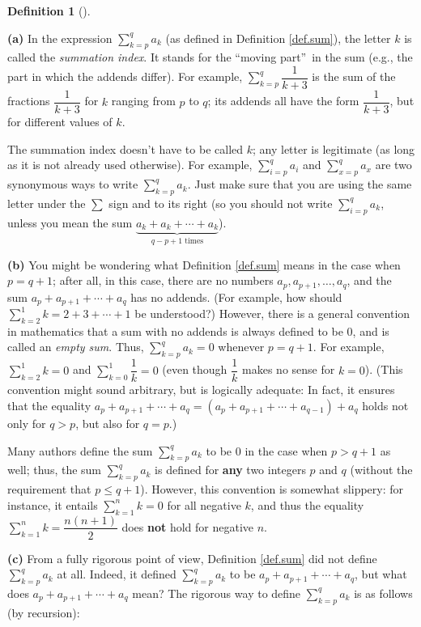 \documentclass[numbers=enddot,12pt,final,onecolumn,notitlepage]{scrartcl}%
\theoremstyle{definition}
\newtheorem{defi}[theo]{Definition}
\newenvironment{definition}[1][]
{\begin{defi}[#1]\begin{leftbar}}
{\end{leftbar}\end{defi}}
\let\sumnonlimits\sum
\renewcommand{\sum}{\sumnonlimits\limits}
\begin{document}
\begin{definition}
\label{def.sum.2}\textbf{(a)} In the expression $\sum_{k=p}^{q}a_{k}$ (as
defined in Definition \ref{def.sum}), the letter $k$ is called the
\textit{summation index}. It stands for the \textquotedblleft moving
part\textquotedblright\ in the sum (e.g., the part in which the addends
differ). For example, $\sum_{k=p}^{q}\dfrac{1}{k+3}$ is the sum of the
fractions $\dfrac{1}{k+3}$ for $k$ ranging from $p$ to $q$; its addends all
have the form $\dfrac{1}{k+3}$, but for different values of $k$.

The summation index doesn't have to be called $k$; any letter is legitimate
(as long as it is not already used otherwise). For example, $\sum_{i=p}%
^{q}a_{i}$ and $\sum_{x=p}^{q}a_{x}$ are two synonymous ways to write
$\sum_{k=p}^{q}a_{k}$. Just make sure that you are using the same letter under
the $\sum$ sign and to its right (so you should not write $\sum_{i=p}^{q}%
a_{k}$, unless you mean the sum $\underbrace{a_{k}+a_{k}+\cdots+a_{k}%
}_{q-p+1\text{ times}}$).

\textbf{(b)} You might be wondering what Definition \ref{def.sum} means in the
case when $p=q+1$; after all, in this case, there are no numbers
$a_{p},a_{p+1},\ldots,a_{q}$, and the sum $a_{p}+a_{p+1}+\cdots+a_{q}$ has no
addends. (For example, how should $\sum_{k=2}^{1}k=2+3+\cdots+1$ be
understood?) However, there is a general convention in mathematics that a sum
with no addends is always defined to be $0$, and is called an \textit{empty
sum}. Thus, $\sum_{k=p}^{q}a_{k}=0$ whenever $p=q+1$. For example, $\sum
_{k=2}^{1}k=0$ and $\sum_{k=0}^{1}\dfrac{1}{k}=0$ (even though $\dfrac{1}{k}$
makes no sense for $k=0$). (This convention might sound arbitrary, but is
logically adequate: In fact, it ensures that the equality $a_{p}%
+a_{p+1}+\cdots+a_{q}=\left(  a_{p}+a_{p+1}+\cdots+a_{q-1}\right)  +a_{q}$
holds not only for $q>p$, but also for $q=p$.)

Many authors define the sum $\sum_{k=p}^{q}a_{k}$ to be $0$ in the case when
$p>q+1$ as well; thus, the sum $\sum_{k=p}^{q}a_{k}$ is defined for
\textbf{any} two integers $p$ and $q$ (without the requirement that $p\leq
q+1$). However, this convention is somewhat slippery: for instance, it entails
$\sum_{k=1}^{n}k=0$ for all negative $k$, and thus the equality $\sum
_{k=1}^{n}k=\dfrac{n\left(  n+1\right)  }{2}$ does \textbf{not} hold for
negative $n$.

\textbf{(c)} From a fully rigorous point of view, Definition \ref{def.sum} did
not define $\sum_{k=p}^{q}a_{k}$ at all. Indeed, it defined $\sum_{k=p}%
^{q}a_{k}$ to be $a_{p}+a_{p+1}+\cdots+a_{q}$, but what does $a_{p}%
+a_{p+1}+\cdots+a_{q}$ mean? The rigorous way to define $\sum_{k=p}^{q}a_{k}$
is as follows (by recursion):


\end{definition}
\end{document}
